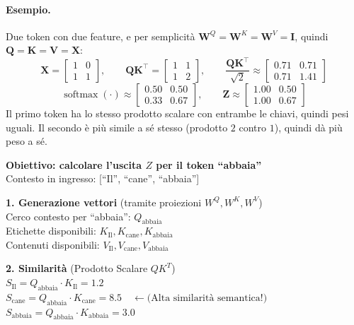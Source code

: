 \documentclass[11pt,a4paper]{article}
\begin{document}
\paragraph{Esempio.} Due token con due feature, e per semplicità $\mathbf{W}^Q=\mathbf{W}^K=\mathbf{W}^V=\mathbf{I}$,
 quindi $\mathbf{Q}=\mathbf{K}=\mathbf{V}=\mathbf{X}$:
\[
\mathbf{X}=\begin{bmatrix}1&0\\1&1\end{bmatrix},\qquad
\mathbf{Q}\mathbf{K}^{\top}=\begin{bmatrix}1&1\\1&2\end{bmatrix},\qquad
\frac{\mathbf{Q}\mathbf{K}^{\top}}{\sqrt{2}}\approx\begin{bmatrix}0.71&0.71\\0.71&1.41\end{bmatrix}
\]
\[
\operatorname{softmax}(\cdot)\approx\begin{bmatrix}0.50&0.50\\0.33&0.67\end{bmatrix},\qquad
\mathbf{Z}\approx\begin{bmatrix}1.00&0.50\\1.00&0.67\end{bmatrix}
\]
Il primo token ha lo stesso prodotto scalare con entrambe le chiavi, quindi pesi uguali. Il secondo è 
più simile a sé stesso (prodotto $2$ contro $1$), quindi dà più peso a sé.

\textbf{Obiettivo: calcolare l'uscita $Z$ per il token ``abbaia''} \\
Contesto in ingresso: [``Il'', ``cane'', ``abbaia'']

\vspace{0.5cm}

\textbf{1. Generazione vettori} (tramite proiezioni $W^Q, W^K, W^V$) \\
Cerco contesto per ``abbaia'': $Q_{\text{abbaia}}$ \\
Etichette disponibili: $K_{\text{Il}}, K_{\text{cane}}, K_{\text{abbaia}}$ \\
Contenuti disponibili: $V_{\text{Il}}, V_{\text{cane}}, V_{\text{abbaia}}$

\vspace{0.5cm}

\textbf{2. Similarità} (Prodotto Scalare $Q K^T$) \\
$S_{\text{Il}} = Q_{\text{abbaia}} \cdot K_{\text{Il}} = 1.2$ \\
$S_{\text{cane}} = Q_{\text{abbaia}} \cdot K_{\text{cane}} = 8.5 \quad \leftarrow \text{(Alta similarità semantica!)}$ \\
$S_{\text{abbaia}} = Q_{\text{abbaia}} \cdot K_{\text{abbaia}} = 3.0$
\end{document}
